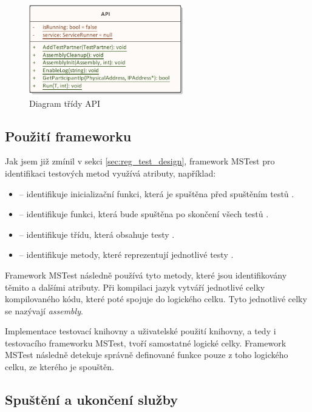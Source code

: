 \begin{figure}[H]
    \centering 
    \includegraphics[width=0.6\textwidth]{assets/img/class_diagram/api.pdf}
    \caption{Diagram třídy API}
    \label{fig:api}
\end{figure}


\subsection{Použití frameworku}
Jak jsem již zmínil v sekci \ref{sec:reg_test_design}, framework MSTest pro identifikaci testových metod využívá atributy, například:

\begin{itemize}
    \item {} -- identifikuje inicializační funkci, která je spuštěna před spuštěním testů \cite{attr_init_clean}.
    \item {} -- identifikuje funkci, která bude spuštěna po skončení všech testů \cite{attr_init_clean}.
    \item {} -- identifikuje třídu, která obsahuje testy \cite{mstest_docs}.
    \item {} -- identifikuje metody, které reprezentují jednotlivé testy \cite{mstest_docs}.
\end{itemize}

Framework MSTest následně používá tyto metody, které jsou identifikovány těmito a dalšími atributy. Při kompilaci jazyk \csharp{} vytváří jednotlivé celky kompilovaného kódu, které poté spojuje do logického celku. Tyto jednotlivé celky se nazývají \textit{assembly}. \cite{assembly}

Implementace testovací knihovny a uživatelské použití knihovny, a tedy i testovacího frameworku MSTest, tvoří samostatné logické celky. Framework MSTest následně detekuje správně definované funkce pouze z toho logického celku, ze kterého je spouštěn.

\subsection{Spuštění a ukončení služby}

